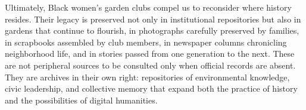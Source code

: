 \documentclass[final]{anthology-ch}
\begin{document}
Ultimately, Black women's garden clubs compel us to reconsider where history resides. Their legacy is preserved not only in institutional repositories but also in gardens that continue to flourish, in photographs carefully preserved by families, in scrapbooks assembled by club members, in newspaper columns chronicling neighborhood life, and in stories passed from one generation to the next. These are not peripheral sources to be consulted only when official records are absent. They are archives in their own right: repositories of environmental knowledge, civic leadership, and collective memory that expand both the practice of history and the possibilities of digital humanities.

\printbibliography
\end{document}
